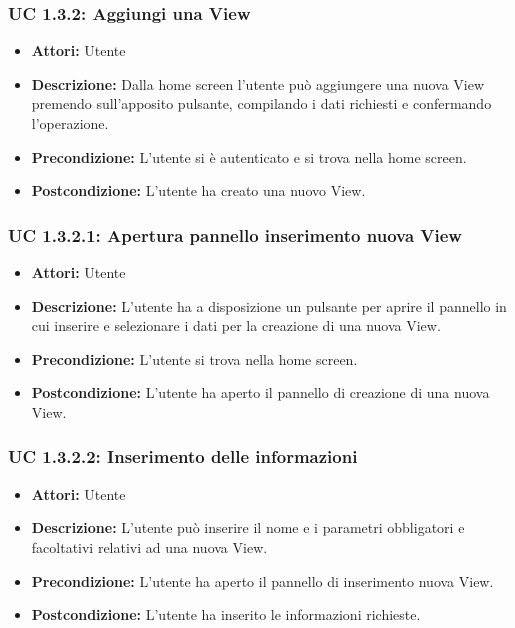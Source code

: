 \subsubsection{UC 1.3.2: Aggiungi una View}

\begin{itemize}
\item \textbf{Attori:} Utente
\item \textbf{Descrizione:} Dalla home screen l'utente può aggiungere una nuova View premendo sull'apposito pulsante, compilando i dati richiesti e confermando l'operazione.
\item \textbf{Precondizione:} L'utente si è autenticato e si trova nella home screen.
\item \textbf{Postcondizione:} L'utente ha creato una nuovo View.
\end{itemize}

\subsubsection{UC 1.3.2.1: Apertura pannello inserimento nuova View}

\begin{itemize}
\item \textbf{Attori:} Utente
\item \textbf{Descrizione:} L'utente ha a disposizione un pulsante per aprire il pannello in cui inserire e selezionare i dati per la creazione di una nuova View.
\item \textbf{Precondizione:} L'utente si trova nella home screen.
\item \textbf{Postcondizione:} L'utente ha aperto il pannello di creazione di una nuova View.
\end{itemize}

\subsubsection{UC 1.3.2.2: Inserimento delle informazioni}

\begin{itemize}
\item \textbf{Attori:} Utente
\item \textbf{Descrizione:} L'utente può inserire il nome e i parametri obbligatori e facoltativi relativi ad una nuova View.
\item \textbf{Precondizione:} L'utente ha aperto il pannello di inserimento nuova View.
\item \textbf{Postcondizione:} L'utente ha inserito le informazioni richieste.
\end{itemize}

